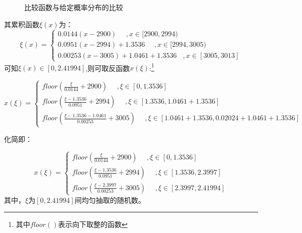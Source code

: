 \documentclass[a4paper,11pt]{article}
\begin{document}
\begin{figure}[!htbp]        
\caption{\label{1} 比较函数与给定概率分布的比较}      
\end{figure}

其累积函数$\xi(x)$为：
\begin{equation}
	\xi(x)=
\left\{
\begin{array}{l}
	0.0144(x-2900) ~~~~~~,x \in [2900,2994) \\
	0.0951(x-2994) + 1.3536 ~~~~~~,x \in [2994,3005) \\
	0.00253(x-3005) + 1.0461 + 1.3536  ~~~~ ,x \in [3005,3013]
\end{array}
\right.
\end{equation}
可知$\xi(x) \in [0,2.41994]$,则可取反函数$x(\xi)$:\footnote{其中$floor()$表示向下取整的函数}

\begin{equation}
x(\xi) = 
\left\{
\begin{array}{l}
 floor(\frac{\xi}{0.0144} +2900) ~~~~~~,\xi \in [0,1.3536]  \\
 floor(\frac{\xi-1.3536}{0.0951}+2994) ~~~~~~,\xi \in [1.3536,1.0461 + 1.3536]  \\
 floor(\frac{\xi-1.3536-1.0461}{0.00253}+3005)~~~~~~,\xi \in [1.0461 + 1.3536,0.02024+1.0461 + 1.3536]

\end{array}
\right.
\end{equation}

化简即：

\begin{equation}
x(\xi) = 
\left\{
\begin{array}{l}
 floor(\frac{\xi}{0.0144} +2900) ~~~~~~,\xi \in [0,1.3536]  \\
 floor(\frac{\xi-1.3536}{0.0951}+2994) ~~~~~~,\xi \in [1.3536,2.3997]  \\
 floor(\frac{\xi-2.3997}{0.00253}+3005)~~~~~~,\xi \in [2.3997,2.41994]
\end{array}
\right.
\end{equation}
其中，$\xi$为$[0,2.41994]$间均匀抽取的随机数。
\end{document}
